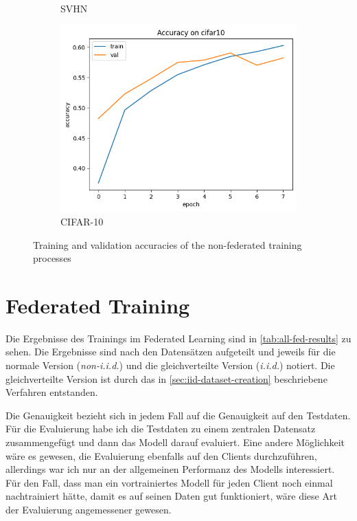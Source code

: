 \begin{figure}
\begin{subfigure}{0.3\textwidth}
		\caption{SVHN}
	\end{subfigure}
	\begin{subfigure}{0.3\textwidth}
		\centering
		\includegraphics[width=\textwidth]{Bilder/cifar-results-local.png}
		\caption{CIFAR-10}
	\end{subfigure}
	\label{fig:local-training-histories}
	\caption{Training and validation accuracies of the non-federated training processes}
\end{figure}

\section{Federated Training}\label{sec:fl-training-results}

Die Ergebnisse des Trainings im Federated Learning sind in \autoref{tab:all-fed-results} zu sehen. Die Ergebnisse sind nach den Datensätzen aufgeteilt und jeweils für die normale Version (\textit{non-i.i.d.}) und die gleichverteilte Version (\textit{i.i.d.}) notiert. Die gleichverteilte Version ist durch das in \autoref{sec:iid-dataset-creation} beschriebene Verfahren entstanden.

Die Genauigkeit bezieht sich in jedem Fall auf die Genauigkeit auf den Testdaten. Für die Evaluierung habe ich die Testdaten zu einem zentralen Datensatz zusammengefügt und dann das Modell darauf evaluiert. Eine andere Möglichkeit wäre es gewesen, die Evaluierung ebenfalls auf den Clients durchzuführen, allerdings war ich nur an der allgemeinen Performanz des Modells interessiert. Für den Fall, dass man ein vortrainiertes Modell für jeden Client noch einmal nachtrainiert hätte, damit es auf seinen Daten gut funktioniert, wäre diese Art der Evaluierung angemessener gewesen.


